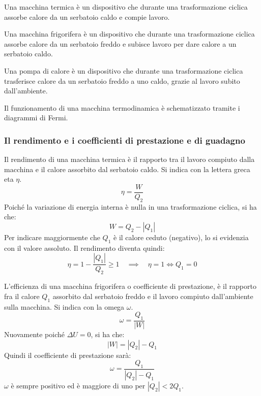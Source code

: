 \documentclass{article}
\begin{document}
Una macchina termica è un dispositivo che durante una trasformazione ciclica assorbe calore da un serbatoio caldo e compie lavoro.

Una macchina frigorifera è un dispositivo che durante una trasformazione ciclica assorbe calore da un serbatoio freddo e subisce lavoro per dare calore a un serbatoio caldo.

Una pompa di calore è un dispositivo che durante una trasformazione ciclica trasferisce calore da un serbatoio freddo a uno caldo, grazie al lavoro subito dall'ambiente.

Il funzionamento di una macchina termodinamica è schematizzato tramite i diagrammi di Fermi.


\subsubsection{Il rendimento e i coefficienti di prestazione e di guadagno}
Il rendimento di una macchina termica è il rapporto tra il lavoro compiuto dalla macchina e il calore assorbito dal serbatoio caldo. Si indica con la lettera greca eta $\eta$.
\begin{equation}
    \eta=\frac{W}{Q_2}
\end{equation}
Poiché la variazione di energia interna è nulla in una trasformazione ciclica, si ha che:
\begin{equation}
    W=Q_2-|Q_1|
\end{equation}
Per indicare maggiormente che $Q_1$ è il calore ceduto (negativo), lo si evidenzia con il valore assoluto. Il rendimento diventa quindi:
\begin{equation}
    \eta=1-\frac{|Q_1|}{Q_2}\geq 1 \quad \implies \quad\eta=1 \iff Q_1=0
\end{equation}
\vspace{3mm}

L'efficienza di una macchina frigorifera o coefficiente di prestazione, è il rapporto fra il calore $Q_1$ assorbito dal serbatoio freddo e il lavoro compiuto dall'ambiente sulla macchina. Si indica con la omega $\omega$.
\begin{equation}
    \omega=\frac{Q_1}{|W|}
\end{equation}
Nuovamente poiché $\Delta U=0$, si ha che:
\begin{equation}
    |W|=|Q_2|-Q_1
\end{equation}
Quindi il coefficiente di prestazione sarà:
\begin{equation}
    \omega=\frac{Q_1}{|Q_2|-Q_1}
\end{equation}
$\omega$ è sempre positivo ed è maggiore di uno per $|Q_2|< 2Q_1$.
\vspace{3mm}
\end{document}
